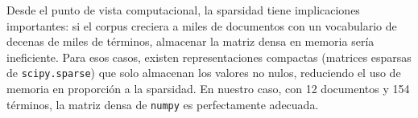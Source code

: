 Desde el punto de vista computacional, la sparsidad tiene implicaciones importantes: si el corpus creciera a miles de documentos con un vocabulario de decenas de miles de términos, almacenar la matriz densa en memoria sería ineficiente. Para esos casos, existen representaciones compactas (matrices esparsas de \texttt{scipy.sparse}) que solo almacenan los valores no nulos, reduciendo el uso de memoria en proporción a la sparsidad. En nuestro caso, con 12 documentos y 154 términos, la matriz densa de \texttt{numpy} es perfectamente adecuada.
